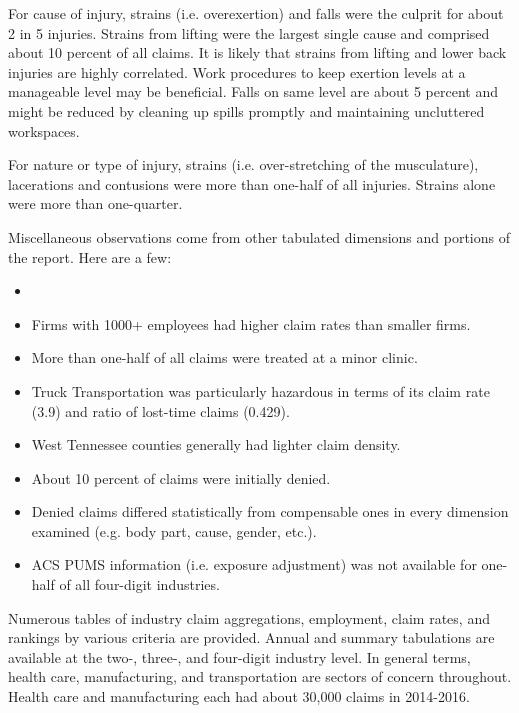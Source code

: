 \documentclass[9pt, oneside]{article}   	%
\begin{document}
For cause of injury, strains (i.e. overexertion) and falls were the culprit for about 2 in 5 injuries. Strains from lifting were the largest single cause and comprised about 10 percent of all claims. It is likely that strains from lifting and lower back injuries are highly correlated.  Work procedures to keep exertion levels at a manageable level may be beneficial. Falls on same level are about 5 percent and might be reduced by cleaning up spills promptly and maintaining uncluttered workspaces.



For nature or type of injury, strains (i.e. over-stretching of the musculature), lacerations and contusions were more than one-half of all injuries. Strains alone were more than one-quarter. 

Miscellaneous observations come from other tabulated dimensions and portions of the report. Here are a few:

\begin{itemize}
\vspace{-0.2in} %
\item[] 
\item Firms with 1000+ employees had higher claim rates than smaller firms. 
\item More than one-half of all claims were treated at a minor clinic.
\item Truck Transportation was particularly hazardous in terms of its claim rate (3.9) and ratio of lost-time claims (0.429).
\item West Tennessee counties generally had lighter claim density.
\item About 10 percent of claims were initially denied.
\item Denied claims differed statistically from compensable ones in every dimension examined (e.g. body part, cause, gender, etc.).
\item ACS PUMS information (i.e. exposure adjustment) was not available for one-half of all four-digit industries.
\end{itemize}




Numerous tables of industry claim aggregations, employment, claim rates, and rankings by various criteria are provided.   Annual and summary tabulations are available at the two-, three-, and four-digit industry level. In general terms, health care, manufacturing, and transportation are sectors of concern throughout. Health care and manufacturing each had about 30,000 claims in 2014-2016.
\end{document}
